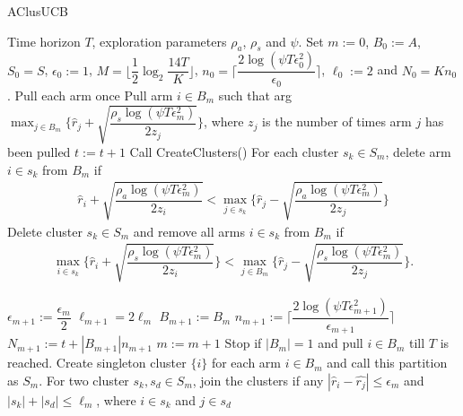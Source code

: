 \begin{algorithm}[th!]
\caption{AClusUCB}
\label{alg:aclusucb}
\begin{algorithmic}
 Time horizon $T$, exploration parameters $\rho_a$, $\rho_s$ and $\psi$.
 Set $m:=0$, $B_{0}:=A$, $S_0 = S$, $\epsilon_{0}:=1$, $M=\big \lfloor \dfrac{1}{2}\log_{2} \dfrac{14T}{K}\big\rfloor$, $n_{0}=\bigg\lceil\dfrac{2\log{(\psi T\epsilon_{0}^{2})}}{\epsilon_{0}}\bigg\rceil$, $\ell_{0}:=2$ and  $N_{0}=Kn_{0}$.
\State Pull each arm once
\State Pull arm $i\in B_m$ such that arg$\max_{j\in B_{m}}\bigg\lbrace \hat{r}_{j} + \sqrt{\dfrac{\rho_{s}\log{(\psi T\epsilon_{m}^{2})}}{2 z_{j}}} \bigg\rbrace$, where $z_j$ is the number of times arm $j$ has been pulled
\State $t:=t+1$
\State Call CreateClusters()
\ArmElim
\State For each cluster $s_k \in S_{m}$, delete arm ${i}\in s_{k}$ from $B_{m}$ if
\begin{align*}
\hat{r}_{i} + \sqrt{\dfrac{\rho_{a}\log{(\psi T\epsilon_{m}^{2})}}{2 z_{i}}}  < \max_{{j}\in s_{k}}\bigg\lbrace\hat{r}_{j} -\sqrt{\dfrac{\rho_{a}\log{(\psi T\epsilon_{m}^{2})}}{2 z_{j}}} \bigg\rbrace
\end{align*}
\EndArmElim
\ClusElim
\State Delete cluster $s_{k}\in S_{m}$ and remove all arms $i\in s_{k}$ from $B_{m}$ if 
\begin{align*}
 \max_{{i}\in s_{k}}\bigg\lbrace\hat{r}_{i} + \sqrt{\dfrac{\rho_{s}\log{(\psi T\epsilon_{m}^{2})}}{2 z_{i}}}\bigg\rbrace 
 < \max_{{j}\in B_{m}} \bigg\lbrace\hat{r}_{j} - \sqrt{\dfrac{\rho_{s} \log{(\psi T\epsilon_{m}^{2})}}{2 z_{j}}}\bigg\rbrace.
\end{align*}
\EndClusElim

\State $\epsilon_{m+1}:=\dfrac{\epsilon_{m}}{2}$\vspace{0.5ex}
\State $\ell_{m+1}=2\ell_{m}$
\State $B_{m+1}:=B_{m}$
\State $n_{m+1}:=\bigg\lceil\dfrac{2\log{(\psi T\epsilon_{m+1}^{2})}}{\epsilon_{m+1}}\bigg\rceil$
\State $N_{m+1}:=t+|B_{m+1}| n_{m+1}$
\State $m:=m+1$
\State Stop if $|B_{m}|=1$ and pull ${i}\in B_{m}$ till $T$ is reached.
\EndIf
\EndFor
{}
\State Create singleton cluster $\lbrace i\rbrace$ for each arm $i\in B_{m}$ and call this partition as $S_{m}$.
\State For two cluster $s_{k},s_{d}\in S_{m}$, join the clusters if any $|\hat{r}_{i}-\hat{r_{j}}| \leq \epsilon_{m}$ and $|s_{k}|+|s_{d}|\leq \ell_{m}$, where $i\in s_{k}$ and $j\in s_{d}$ 
\EndProcedure
\end{algorithmic}
\end{algorithm}

